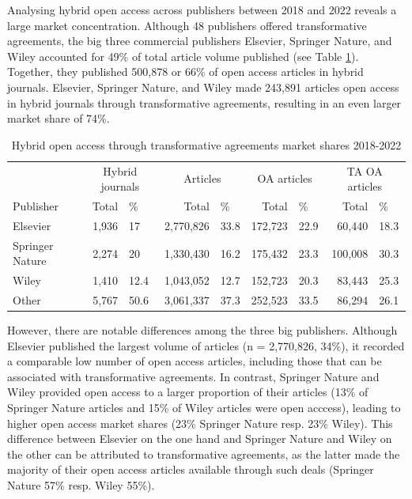 \documentclass[a4paper,man,floatsintext,longtable,noextraspace,12pt]{apa6}
\begin{document}
Analysing hybrid open access across publishers between 2018 and 2022
reveals a large market concentration. Although 48 publishers offered
transformative agreements, the big three commercial publishers Elsevier,
Springer Nature, and Wiley accounted for 49\% of total article volume
published (see Table \ref{tab:publisher_league_table}). Together, they
published 500,878 or 66\% of open access articles in hybrid journals.
Elsevier, Springer Nature, and Wiley made 243,891 articles open access
in hybrid journals through transformative agreements, resulting in an
even larger market share of 74\%.

\begin{table}[H]

\caption{\label{tab:publisher_league_table}Hybrid open access through transformative agreements market shares 2018-2022}
\centering
\begin{tabular}[t]{lrlrlrlrl}
\toprule
\multicolumn{1}{c}{ } & \multicolumn{2}{c}{Hybrid journals} & \multicolumn{2}{c}{Articles} & \multicolumn{2}{c}{OA articles} & \multicolumn{2}{c}{TA OA articles} \\
\cmidrule(l{3pt}r{3pt}){2-3} \cmidrule(l{3pt}r{3pt}){4-5} \cmidrule(l{3pt}r{3pt}){6-7} \cmidrule(l{3pt}r{3pt}){8-9}
Publisher & Total & \% & Total & \% & Total & \% & Total & \%\\
\midrule
Elsevier & 1,936 & 17 & 2,770,826 & 33.8 & 172,723 & 22.9 & 60,440 & 18.3\\
Springer Nature & 2,274 & 20 & 1,330,430 & 16.2 & 175,432 & 23.3 & 100,008 & 30.3\\
Wiley & 1,410 & 12.4 & 1,043,052 & 12.7 & 152,723 & 20.3 & 83,443 & 25.3\\
Other & 5,767 & 50.6 & 3,061,337 & 37.3 & 252,523 & 33.5 & 86,294 & 26.1\\
\bottomrule
\end{tabular}
\end{table}

However, there are notable differences among the three big publishers.
Although Elsevier published the largest volume of articles (n =
2,770,826, 34\%), it recorded a comparable low number of open access
articles, including those that can be associated with transformative
agreements. In contrast, Springer Nature and Wiley provided open access
to a larger proportion of their articles (13\% of Springer Nature
articles and 15\% of Wiley articles were open acccess), leading to
higher open access market shares (23\% Springer Nature resp. 23\%
Wiley). This difference between Elsevier on the one hand and Springer
Nature and Wiley on the other can be attributed to transformative
agreements, as the latter made the majority of their open access
articles available through such deals (Springer Nature 57\% resp. Wiley
55\%).
\end{document}
